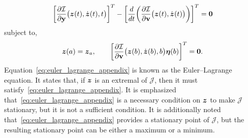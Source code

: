 \documentclass[3p,computermodern,10pt]{elsarticle}
\begin{document}
\begin{appendices}
\begin{equation}\label{eq:euler_lagrange_appendix}
\bigg[ \frac{\partial \mathcal{I}  }{\partial \mathbf{y} } \big(\boldsymbol z(t),\dot{\boldsymbol z}(t) ,t\big) \bigg]^T - \bigg[ \frac{d}{dt}\bigg( \frac{\partial \mathcal{I}}{\partial \mathbf{{v}} }  \big(\boldsymbol z(t),\dot{\boldsymbol z}(t) \big) \bigg) \bigg]^T = \boldsymbol 0  
\end{equation}
subject to,
$$
\boldsymbol z(a) = \boldsymbol z_a, \qquad \bigg[ \frac{\partial \mathcal{I}}{\partial \mathbf{{v}}} \big(\boldsymbol z(b),\dot{\boldsymbol z}(b),b \big) \boldsymbol \eta(b) \bigg]^T = \boldsymbol 0.
$$
Equation~\eqref{eq:euler_lagrange_appendix} is known as the Euler--Lagrange equation. It states that, if $\boldsymbol z$ is an extremal of $\mathcal{J}$, then it must satisfy~\eqref{eq:euler_lagrange_appendix}. It is emphasized that~\eqref{eq:euler_lagrange_appendix} is a necessary condition on $\boldsymbol z$ to make $\mathcal{J}$ stationary, but it is not a sufficient condition. It is additionally noted that~\eqref{eq:euler_lagrange_appendix} provides a stationary point of $\mathcal{J}$, but the resulting stationary point can be either a maximum or a minimum.


\end{appendices}
\end{document}
